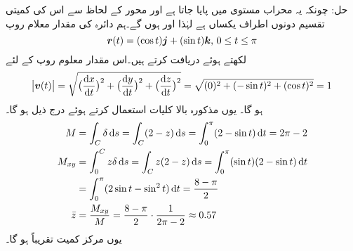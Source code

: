 حل:\quad
چونکہ یہ  محراب مستوی  میں پایا جاتا ہے  اور محور  کے لحاظ سے اس کی کمیتی تقسیم دونوں اطراف یکساں ہے   لہٰذا  اور  ہوں گے۔ہم دائرہ کی مقدار معلام روپ
\[{{\boldsymbol{r}}}(t)=(\cos t){\boldsymbol{j}}+(\sin t){\boldsymbol{k}},\, 0\le t\le \pi\]
 لکھتے ہوئے  دریافت کرتے ہیں۔اس مقدار معلوم روپ کے لئے
\[\abs{\kvec{v}(t)}=\sqrt{\big(\frac{\dif x}{\dif t}\big)^2+\big(\frac{\dif y}{\dif t}\big)^2+\big(\frac{\dif z}{\dif t}\big)^2}=\sqrt{(0)^2+(-\sin t)^2+(\cos t)^2}=1\]
ہو گا۔ یوں مذکورہ بالا کلیات استعمال کرتے ہوئے درج ذیل ہو گا۔
\begin{align*}
M&=\int_C \delta \dif s=\int_C (2-z)\dif s=\int_0^{\pi}(2-\sin t)\dif t=2\pi-2\\
M_{xy}&=\int_0^C z\delta \dif s=\int_C z(2-z)\dif s=\int_0^{\pi} (\sin t)(2-\sin t)\dif t\\
&=\int_0^{\pi} (2\sin t-\sin^2 t)\dif t=\frac{8-\pi}{2}\\
\bar{z}&=\frac{M_{xy}}{M}=\frac{8-\pi}{2}\cdot\frac{1}{2\pi-2}\approx 0.57
\end{align*}
یوں مرکز کمیت تقریباً  ہو گا۔
